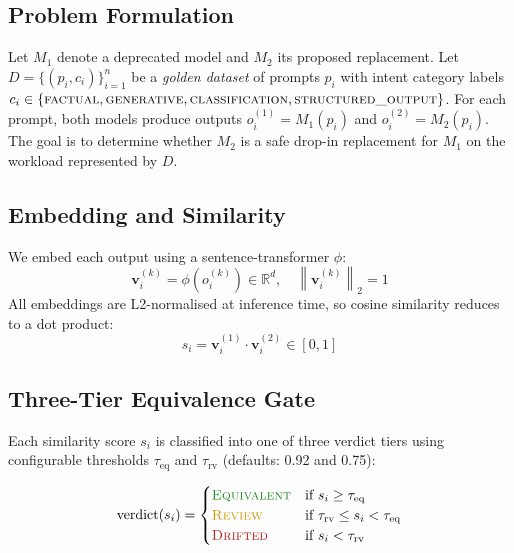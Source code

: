 \documentclass[11pt,a4paper]{article}
\begin{document}
\subsection{Problem Formulation}

Let $M_1$ denote a deprecated model and $M_2$ its proposed replacement.
Let $D = \{(p_i, c_i)\}_{i=1}^n$ be a \emph{golden dataset} of prompts $p_i$ with
intent category labels $c_i \in \{\textsc{factual}, \textsc{generative},
\textsc{classification}, \textsc{structured\_output}\}$.
For each prompt, both models produce outputs $o_i^{(1)} = M_1(p_i)$ and
$o_i^{(2)} = M_2(p_i)$.
The goal is to determine whether $M_2$ is a safe drop-in replacement for $M_1$
on the workload represented by $D$.

\subsection{Embedding and Similarity}

We embed each output using a sentence-transformer $\phi$:
\begin{equation}
  \mathbf{v}_i^{(k)} = \phi\!\left(o_i^{(k)}\right) \in \mathbb{R}^d,
  \quad \left\|\mathbf{v}_i^{(k)}\right\|_2 = 1
\end{equation}
All embeddings are L2-normalised at inference time, so cosine similarity reduces to
a dot product:
\begin{equation}
  s_i = \mathbf{v}_i^{(1)} \cdot \mathbf{v}_i^{(2)} \in [0, 1]
\end{equation}

\subsection{Three-Tier Equivalence Gate}

Each similarity score $s_i$ is classified into one of three verdict tiers using
configurable thresholds $\tau_\text{eq}$ and $\tau_\text{rv}$
(defaults: 0.92 and 0.75):

\begin{equation}
  \text{verdict}(s_i) =
  \begin{cases}
    \textcolor{eqgreen}{\textsc{Equivalent}} & \text{if } s_i \geq \tau_\text{eq} \\
    \textcolor{rvyellow}{\textsc{Review}}    & \text{if } \tau_\text{rv} \leq s_i < \tau_\text{eq} \\
    \textcolor{drred}{\textsc{Drifted}}      & \text{if } s_i < \tau_\text{rv}
  \end{cases}
\end{equation}
\end{document}
